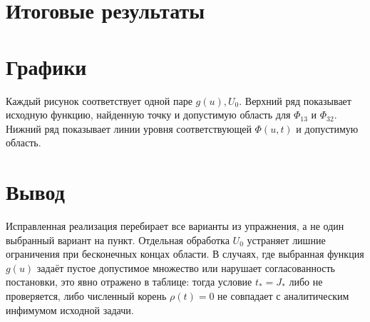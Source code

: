 \documentclass[12pt,a4paper]{article}
\begin{document}
\section*{Итоговые результаты}


\section*{Графики}
Каждый рисунок соответствует одной паре \(g(u),U_0\). Верхний ряд показывает исходную функцию, найденную точку и допустимую область для \(\Phi_{13}\) и \(\Phi_{32}\). Нижний ряд показывает линии уровня соответствующей \(\Phi(u,t)\) и допустимую область.



\section*{Вывод}
Исправленная реализация перебирает все варианты из упражнения, а не один выбранный вариант на пункт. Отдельная обработка \(U_0\) устраняет лишние ограничения при бесконечных концах области. В случаях, где выбранная функция \(g(u)\) задаёт пустое допустимое множество или нарушает согласованность постановки, это явно отражено в таблице: тогда условие \(t_*=J_*\) либо не проверяется, либо численный корень \(\rho(t)=0\) не совпадает с аналитическим инфимумом исходной задачи.
\end{document}
